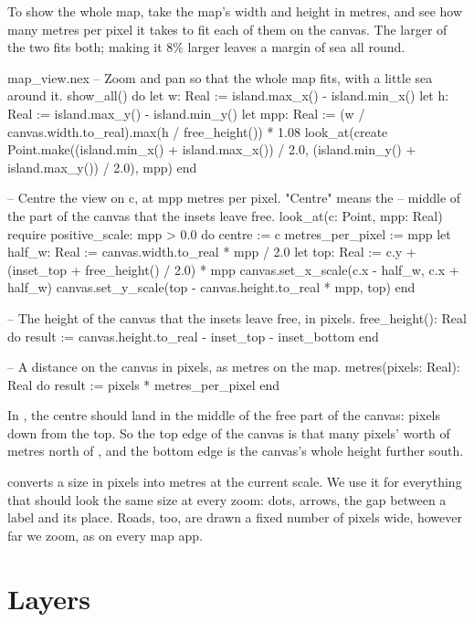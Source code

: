 To show the whole map, take the map's width and height in metres, and see
how many metres per pixel it takes to fit each of them on the canvas. The
larger of the two fits both; making it 8\% larger leaves a margin of sea
all round.

\begin{continued}{map_view.nex}
  -- Zoom and pan so that the whole map fits, with a little sea around it.
  show_all() do
    let w: Real := island.max_x() - island.min_x()
    let h: Real := island.max_y() - island.min_y()
    let mpp: Real := (w / canvas.width.to_real).max(h / free_height()) * 1.08
    look_at(create Point.make((island.min_x() + island.max_x()) / 2.0,
      (island.min_y() + island.max_y()) / 2.0), mpp)
  end

  -- Centre the view on c, at mpp metres per pixel. "Centre" means the
  -- middle of the part of the canvas that the insets leave free.
  look_at(c: Point, mpp: Real)
  require
    positive_scale: mpp > 0.0
  do
    centre := c
    metres_per_pixel := mpp
    let half_w: Real := canvas.width.to_real * mpp / 2.0
    let top: Real := c.y + (inset_top + free_height() / 2.0) * mpp
    canvas.set_x_scale(c.x - half_w, c.x + half_w)
    canvas.set_y_scale(top - canvas.height.to_real * mpp, top)
  end

  -- The height of the canvas that the insets leave free, in pixels.
  free_height(): Real do
    result := canvas.height.to_real - inset_top - inset_bottom
  end

  -- A distance on the canvas in pixels, as metres on the map.
  metres(pixels: Real): Real do
    result := pixels * metres_per_pixel
  end
\end{continued}

In , the centre  should land in the middle of the
free part of the canvas:  pixels
down from the top. So the top edge of the canvas is that many pixels'
worth of metres north of , and the bottom edge is the canvas's
whole height further south.

 converts a size in pixels into metres at the current scale.
We use it for everything that should look the same size at every zoom:
dots, arrows, the gap between a label and its place. Roads, too, are drawn
a fixed number of pixels wide, however far we zoom, as on every map app.

\section{Layers}

